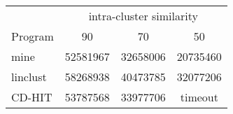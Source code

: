 \documentclass[]{article}
\begin{document}
\begin{table}%
\centering
\begin{tabular}{l c c c}
\toprule
        & \multicolumn{3}{c}{intra-cluster similarity} \\
Program & 90 & 70 & 50 \\
\midrule
mine & 52581967 & 32658006 & 20735460 \\
linclust & 58268938 & 40473785 & 32077206 \\
CD-HIT & 53787568 & 33977706 & timeout \\
\bottomrule
\end{tabular}
\end{table}


%


\end{document}
